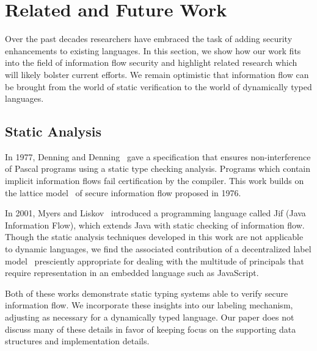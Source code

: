 
\section{Related and Future Work}
\label{sec:relatedwork}


Over the past decades researchers have embraced the task of adding security enhancements to existing languages.
In this section, we show how our work fits into the field of information flow security and highlight related research which will likely bolster current efforts.
We remain optimistic that information flow can be brought from the world of static verification to the world of dynamically typed languages.

\subsection{Static Analysis}

In 1977, Denning and Denning~\cite{359712} gave a specification that ensures non-interference of Pascal programs using a static type checking analysis.
Programs which contain implicit information flows fail certification by the compiler.
This work builds on the lattice model~\cite{denning1976lattice} of secure information flow proposed in 1976.

In 2001, Myers and Liskov~\cite{myers2001jif} introduced a programming language called Jif (Java Information Flow), which extends Java with static checking of information flow.
Though the static analysis techniques developed in this work are not applicable to dynamic languages, we find the associated contribution of a decentralized label model~\cite{363526} presciently appropriate for dealing with the multitude of principals that require representation in an embedded language such as JavaScript.

Both of these works demonstrate static typing systems able to verify secure information flow.
We incorporate these insights into our labeling mechanism, adjusting as necessary for a dynamically typed language.
Our paper does not discuss many of these details in favor of keeping focus on the supporting data structures and implementation details.

